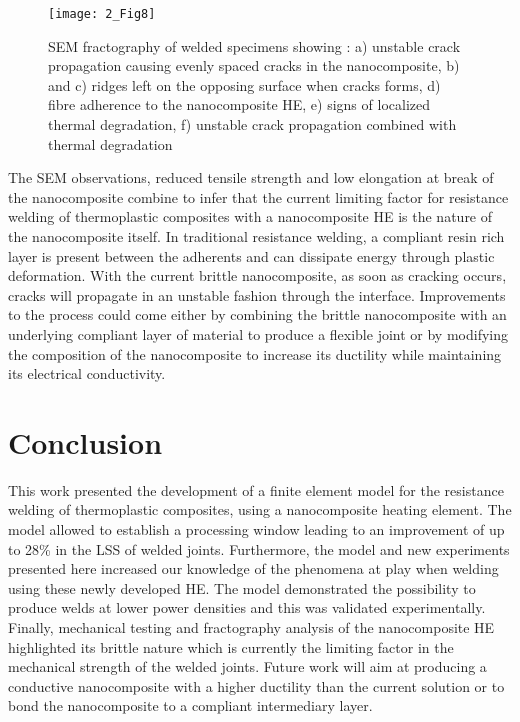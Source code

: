 \begin{figure}[htb]
	\center
	\texttt{[image: 2\_Fig8]}
	\caption{SEM fractography of welded specimens showing : a) unstable crack propagation causing evenly spaced cracks in the nanocomposite, b) and c) ridges left on the opposing surface when cracks forms, d) fibre adherence to the nanocomposite HE, e) signs of localized thermal degradation, f) unstable crack propagation combined with thermal degradation \cite{Brassard2019b}}
	\label{fig:2_Fig8}
\end{figure} 

The SEM observations, reduced tensile strength and low elongation at break of the nanocomposite combine to infer that the current limiting factor for resistance welding of thermoplastic composites with a nanocomposite HE is the nature of the nanocomposite itself. 
In traditional resistance welding, a compliant resin rich layer is present between the adherents and can dissipate energy through plastic deformation. 
With the current brittle nanocomposite, as soon as cracking occurs, cracks will propagate in an unstable fashion through the interface. 
Improvements to the process could come either by combining the brittle nanocomposite with an underlying compliant layer of material to produce a flexible joint or by modifying the composition of the nanocomposite to increase its ductility while maintaining its electrical conductivity. 

\FloatBarrier
\section{Conclusion}

This work presented the development of a finite element model for the resistance welding of thermoplastic composites, using a nanocomposite heating element. 
The model allowed to establish a processing window leading to an improvement of up to 28\% in the LSS of welded joints. 
Furthermore, the model and new experiments presented here increased our knowledge of the phenomena at play when welding using these newly developed HE. 
The model demonstrated the possibility to produce welds at lower power densities and this was validated experimentally. 
Finally, mechanical testing and fractography analysis of the nanocomposite HE highlighted its brittle nature which is currently the limiting factor in the mechanical strength of the welded joints. 
Future work will aim at producing a conductive nanocomposite with a higher ductility than the current solution or to bond the nanocomposite to a compliant intermediary layer. 

